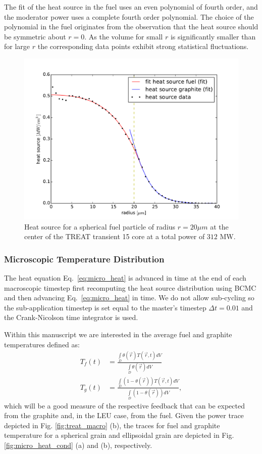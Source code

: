 \documentclass{anstrans}
\begin{document}
The fit of the heat source in the fuel uses an even polynomial of fourth order, and the moderator power uses a complete fourth order polynomial. The choice of the polynomial in the fuel originates from the observation that the
heat source should be symmetric about $r=0$. As the volume for small $r$ is significantly smaller than for large $r$ the corresponding data points exhibit strong statistical fluctuations.

\begin{figure}[ht] %
 \centering
  \includegraphics[scale=0.45]{./figures/heat_source.pdf}
  \caption{Heat source for a spherical fuel particle of radius $r=20 \mu m$ at the center of the TREAT transient 15 core at a total power of $312$ MW. \label{fig:heat_source}}
\end{figure}

\subsubsection{Microscopic Temperature Distribution}
The heat equation Eq.~\eqref{eq:micro_heat} is advanced in time at the end of each macroscopic timestep first recomputing the heat source distribution using BCMC and then advancing Eq.~\eqref{eq:micro_heat} in time. We do not allow sub-cycling so the sub-application timestep is set equal to the master's timestep $\Delta t = 0.01$ and the Crank-Nicolson time integrator is used.

Within this manuscript we are interested in the average fuel and graphite temperatures defined as:
\begin{align}
  T_f(t) &= \frac{\int\limits_{D} \theta(\vec{r}) T(\vec{r}, t) dV }{\int\limits_{D} \theta(\vec{r}) dV} \nonumber \\
     T_g(t) &= \frac{\int\limits_{D} (1 - \theta(\vec{r})) T(\vec{r}, t) dV }{\int\limits_{D} (1 - \theta(\vec{r})) dV},
\end{align}
which will be a good measure of the respective feedback that can be expected from the graphite and, in the LEU case, from
the fuel. Given the power trace depicted in Fig. \ref{fig:treat_macro} (b), the traces for fuel and graphite temperature for a spherical grain and ellipsoidal grain are depicted in Fig. \ref{fig:micro_heat_cond} (a) and (b), respectively.
\end{document}
